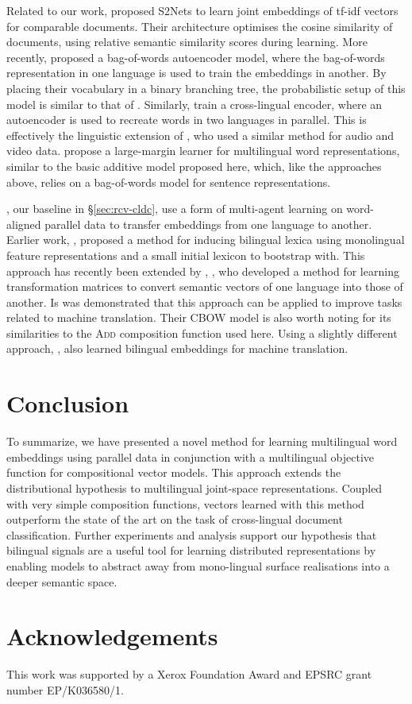 \documentclass[11pt]{article}
\newcommand{\addMod}{\textsc{Add}\xspace}
\begin{document}
Related to our work,
 proposed S2Nets to learn joint embeddings of tf-idf vectors
for comparable documents. Their architecture optimises the cosine similarity of
documents, using relative semantic similarity scores during learning.
More recently,  proposed a bag-of-words
autoencoder model, where the bag-of-words representation in one language is used
to train the embeddings in another. By placing their vocabulary in a binary
branching tree, the probabilistic setup of this model is similar to that of
. Similarly,  train a cross-lingual
encoder, where an autoencoder is used to recreate words in two languages in
parallel. This is effectively the linguistic extension of ,
who used a similar method for audio and video data.
 propose a large-margin learner for multilingual word
representations, similar to the basic additive model proposed here, which, like
the approaches above, relies on a bag-of-words model for sentence
representations.

, our baseline in \S\ref{sec:rcv-cldc}, use a form of
multi-agent learning on word-aligned parallel data to transfer embeddings from
one language to another.
Earlier work, , proposed a method for inducing bilingual
lexica using monolingual feature representations and a small initial lexicon to
bootstrap with.  This approach has recently been extended by
, , who developed a method for learning
transformation matrices to convert semantic vectors of one language into those
of another.  Is was demonstrated that this approach can be applied to improve
tasks related to machine translation.  Their CBOW model is also worth noting for
its similarities to the \addMod composition function used here.  Using a
slightly different approach, , also learned bilingual embeddings
for machine translation.
 \section{Conclusion}

To summarize, we have presented a novel method for learning multilingual word
embeddings using parallel data in conjunction with a multilingual objective
function for compositional vector models. This approach extends the
distributional hypothesis to multilingual joint-space representations.  Coupled
with very simple composition functions, vectors learned with this method
outperform the state of the art on the task of cross-lingual document
classification.  Further experiments and analysis support our hypothesis that
bilingual signals are a useful tool for learning distributed representations by
enabling models to abstract away from mono-lingual surface realisations into a
deeper semantic space.

\section*{Acknowledgements}
This work was supported by a Xerox Foundation Award and EPSRC grant number
EP/K036580/1.
 


\end{document}

